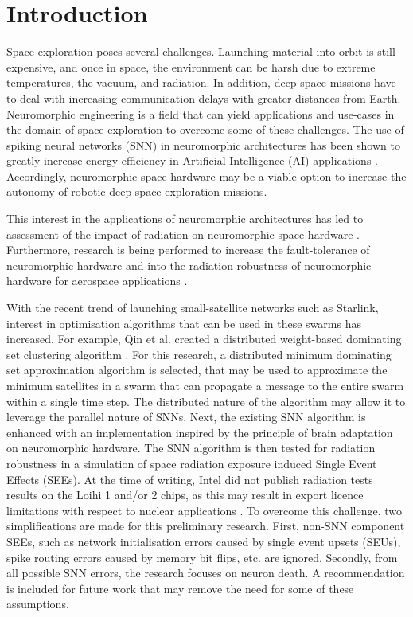\section{Introduction}\label{sec:introduction}
Space exploration poses several challenges. Launching material into orbit is still expensive, and once in space, the environment can be harsh due to extreme temperatures, the vacuum, and radiation. In addition, deep space missions have to deal with increasing communication delays with greater distances from Earth. Neuromorphic engineering is a field that can yield applications and use-cases in the domain of space exploration to overcome some of these challenges. The use of spiking neural networks (SNN) in neuromorphic architectures has been shown to greatly increase energy efficiency in Artificial Intelligence (AI) applications \cite{davies_loihi_2018}. Accordingly, neuromorphic space hardware may be a viable option to increase the autonomy of robotic deep space exploration missions. 

This interest in the applications of neuromorphic architectures has led to assessment of the impact of radiation on neuromorphic space hardware \cite{cantley_impact_2021,roffe_neutron-induced_2021}. Furthermore, research is being performed to increase the fault-tolerance of neuromorphic hardware \cite{tran_design_2011} and into the radiation robustness of neuromorphic hardware for aerospace applications \cite{vaz_cmos_2020}. %

With the recent trend of launching small-satellite networks such as Starlink, interest in optimisation algorithms that can be used in these swarms has increased.
For example, Qin et al. created a distributed weight-based dominating set clustering algorithm \cite{qin2012weight}.
For this research, a distributed minimum dominating set approximation algorithm is selected, that may be used to approximate the minimum satellites in a swarm that can propagate a message to the entire swarm within a single time step. The distributed nature of the algorithm may allow it to leverage the parallel nature of SNNs.
Next, the existing SNN algorithm is enhanced with an implementation inspired by the principle of brain adaptation on neuromorphic hardware. The SNN algorithm is then tested for radiation robustness in a simulation of space radiation exposure induced Single Event Effects (SEEs). At the time of writing, Intel did not publish radiation tests results on the Loihi 1 and/or 2 chips, as this may result in export licence limitations with respect to nuclear applications \cite{inrc_meeting}. To overcome this challenge, two simplifications are made for this preliminary research. First, non-SNN component SEEs, such as network initialisation errors caused by single event upsets (SEUs), spike routing errors caused by memory bit flips, etc. are ignored. Secondly, from all possible SNN errors, the research focuses on neuron death. A recommendation is included for future work that may remove the need for some of these assumptions. %

